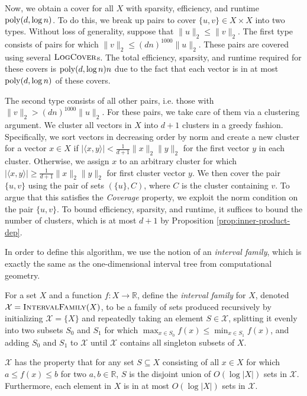 Now, we obtain a cover for all $X$ with sparsity, efficiency, and runtime $\mathrm{poly}(d,\log n)$. To do this, we break up pairs to cover $\{u,v\}\in X\times X$ into two types. Without loss of generality, suppose that $\|u\|_2\le \|v\|_2$. The first type consists of pairs for which $\|v\|_2\le (dn)^{1000} \|u\|_2$. These pairs are covered using several $\textsc{LogCover}$s. The total efficiency, sparsity, and runtime required for these covers is $\mathrm{poly}(d,\log n) n$ due to the fact that each vector is in at most $\mathrm{poly}(d,\log n)$ of these covers.

The second type consists of all other pairs, i.e. those with $\|v\|_2 > (dn)^{1000} \|u\|_2$. For these pairs, we take care of them via a clustering argument. We cluster all vectors in $X$ into $d+1$ clusters in a greedy fashion. Specifically, we sort vectors in decreasing order by norm and create a new cluster for a vector $x\in X$ if $|\langle x,y\rangle | < \frac{1}{d+1} \|x\|_2 \|y\|_2$ for the first vector $y$ in each cluster. Otherwise, we assign $x$ to an arbitrary cluster for which $|\langle x,y\rangle | \ge \frac{1}{d+1} \|x\|_2 \|y\|_2$ for first cluster vector $y$. We then cover the pair $\{u,v\}$ using the pair of sets $(\{u\},C)$, where $C$ is the cluster containing $v$. To argue that this satisfies the \emph{Coverage} property, we exploit the norm condition on the pair $\{u,v\}$. To bound efficiency, sparsity, and runtime, it suffices to bound the number of clusters, which is at most $d+1$ by Proposition \ref{prop:inner-product-dep}.

In order to define this algorithm, we use the notion of an \emph{interval family}, which is exactly the same as the one-dimensional interval tree from computational geometry.

\begin{definition}
For a set $X$ and a function $f:X\rightarrow \mathbb{R}$, define the \emph{interval family} for $X$, denoted $\mathcal X = \textsc{IntervalFamily}(X)$, to be a family of sets produced recursively by initializing $\mathcal X = \{X\}$ and repeatedly taking an element $S\in \mathcal X$, splitting it evenly into two subsets $S_0$ and $S_1$ for which $\max_{x\in S_0} f(x)\le \min_{x\in S_1} f(x)$, and adding $S_0$ and $S_1$ to $\mathcal X$ until $\mathcal X$ contains all singleton subsets of $X$.

$\mathcal X$ has the property that for any set $S\subseteq X$ consisting of all $x\in X$ for which $a\le f(x)\le b$ for two $a,b\in \mathbb{R}$, $S$ is the disjoint union of $O(\log |X|)$ sets in $\mathcal X$. Furthermore, each element in $X$ is in at most $O(\log |X|)$ sets in $\mathcal X$.
\end{definition}

